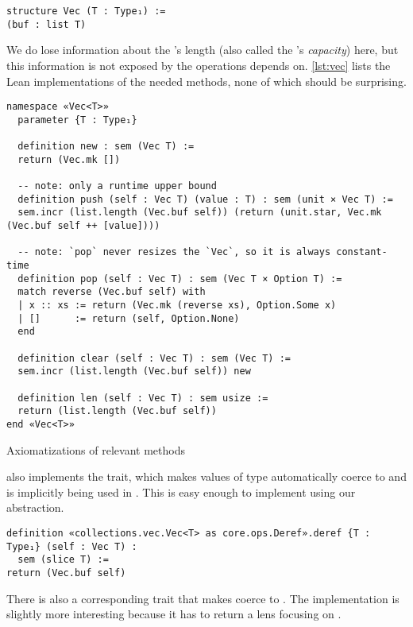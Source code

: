 \begin{verbatim}
structure Vec (T : Type₁) :=
(buf : list T)
\end{verbatim}

We do lose information about the 's length (also called the
's \emph{capacity}) here, but this information is not exposed by the
 operations  depends on. \autoref{lst:vec} lists the Lean implementations of
the needed  methods, none of which should be surprising.

\begin{listing}[bt!]
\begin{verbatim}
namespace «Vec<T>»
  parameter {T : Type₁}

  definition new : sem (Vec T) :=
  return (Vec.mk [])

  -- note: only a runtime upper bound
  definition push (self : Vec T) (value : T) : sem (unit × Vec T) :=
  sem.incr (list.length (Vec.buf self)) (return (unit.star, Vec.mk (Vec.buf self ++ [value])))

  -- note: `pop` never resizes the `Vec`, so it is always constant-time
  definition pop (self : Vec T) : sem (Vec T × Option T) :=
  match reverse (Vec.buf self) with
  | x :: xs := return (Vec.mk (reverse xs), Option.Some x)
  | []      := return (self, Option.None)
  end

  definition clear (self : Vec T) : sem (Vec T) :=
  sem.incr (list.length (Vec.buf self)) new

  definition len (self : Vec T) : sem usize :=
  return (list.length (Vec.buf self))
end «Vec<T>»
\end{verbatim}
  
  \caption{Axiomatizations of relevant  methods}
  \label{lst:vec}
\end{listing}

 also implements the  trait, which makes values of type
 automatically coerce to \rust{&[T]} and is implicitly being used
in . This is easy enough to implement using our abstraction.

\begin{verbatim}
definition «collections.vec.Vec<T> as core.ops.Deref».deref {T : Type₁} (self : Vec T) :
  sem (slice T) :=
return (Vec.buf self)
\end{verbatim}

There is also a corresponding  trait that makes  coerce to . The implementation is slightly more
interesting because it has to return a lens focusing on .

